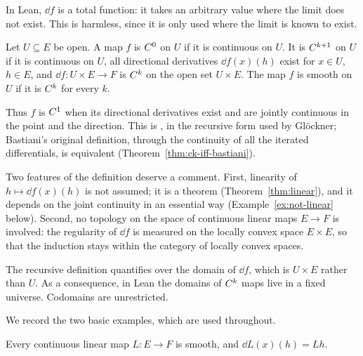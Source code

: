 \begin{remark}
  In Lean, $\dd f$ is a total function: it takes an arbitrary value where the limit does not
  exist. This is harmless, since it is only used where the limit is known to exist.
\end{remark}

\begin{definition}
  \label{def:ck}
  \leanok
  Let $U \subseteq E$ be open. A map $f$ is $C^{0}$ on $U$ if it is continuous on $U$. It is
  $C^{k+1}$ on $U$ if it is continuous on $U$, all directional derivatives $\dd f(x)(h)$ exist
  for $x \in U$, $h \in E$, and $\dd f \colon U \times E \to F$ is $C^{k}$ on the open set
  $U \times E$. The map $f$ is smooth on $U$ if it is $C^{k}$ for every $k$.
\end{definition}

Thus $f$ is $C^{1}$ when its directional derivatives exist and are jointly continuous in the
point and the direction. This is \cite[1.2.1 and 1.3.1]{GN26}, in the recursive form used by Glöckner;
Bastiani's original definition, through the continuity of all the iterated differentials, is
equivalent (Theorem~\ref{thm:ck-iff-bastiani}).

\begin{remark}
  Two features of the definition deserve a comment. First, linearity of $h \mapsto \dd f(x)(h)$
  is not assumed; it is a theorem (Theorem~\ref{thm:linear}), and it depends on the joint
  continuity in an essential way (Example~\ref{ex:not-linear} below). Second, no topology on
  the space of continuous linear maps $E \to F$ is involved: the regularity of $\dd f$ is
  measured on the locally convex space $E \times E$, so that the induction stays within the
  category of locally convex spaces.
\end{remark}

\begin{remark}
  The recursive definition quantifies over the domain of $\dd f$, which is $U \times E$ rather
  than $U$. As a consequence, in Lean the domains of $C^{k}$ maps live in a fixed universe.
  Codomains are unrestricted.
\end{remark}

We record the two basic examples, which are used throughout.

\begin{lemma}
  \label{lem:clm-smooth}
  \leanok
  Every continuous linear map $L \colon E \to F$ is smooth, and $\dd L(x)(h) = L h$.
\end{lemma}

